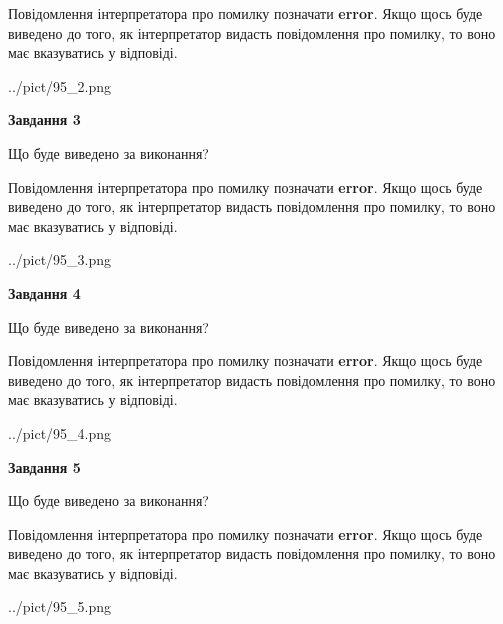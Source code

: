 \documentclass[12pt, ukrainian]{article}
\begin{document}
{\begin {large}
Повідомлення інтерпретатора про помилку позначати \textbf{error}.
Якщо щось буде виведено до того, як інтерпретатор видасть повідомлення про помилку, 
то воно має вказуватись у відповіді. \par


\begin{center}
	{../pict/95_2.png}
\end{center}
\newpage

{\begin {center}\textbf{Завдання 3}\end {center}}\par
Що буде виведено за виконання?

Повідомлення інтерпретатора про помилку позначати \textbf{error}.
Якщо щось буде виведено до того, як інтерпретатор видасть повідомлення про помилку, 
то воно має вказуватись у відповіді. \par


\begin{center}
	{../pict/95_3.png}
\end{center}
\newpage

{\begin {center}\textbf{Завдання 4}\end {center}}\par
Що буде виведено за виконання?

Повідомлення інтерпретатора про помилку позначати \textbf{error}.
Якщо щось буде виведено до того, як інтерпретатор видасть повідомлення про помилку, 
то воно має вказуватись у відповіді. \par


\begin{center}
	{../pict/95_4.png}
\end{center}
\newpage

{\begin {center}\textbf{Завдання 5}\end {center}}\par
Що буде виведено за виконання?

Повідомлення інтерпретатора про помилку позначати \textbf{error}.
Якщо щось буде виведено до того, як інтерпретатор видасть повідомлення про помилку, 
то воно має вказуватись у відповіді. \par


\begin{center}
	{../pict/95_5.png}
\end{center}
\newpage


\end{large}}
\end{document}

